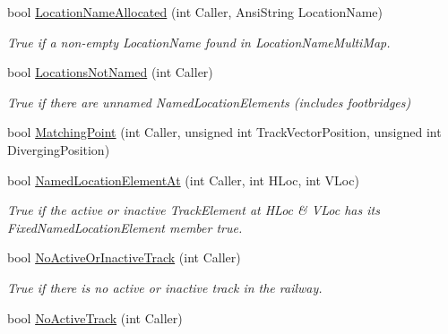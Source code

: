 \begin{DoxyCompactItemize}
\mbox{\label{class_t_track_adf9b0df7c51a36a4fca3a4ced7cc4a35}} 
bool \mbox{\hyperlink{class_t_track_adf9b0df7c51a36a4fca3a4ced7cc4a35}{Location\+Name\+Allocated}} (int Caller, Ansi\+String Location\+Name)
\begin{DoxyCompactList}\small\item\em True if a non-\/empty Location\+Name found in Location\+Name\+Multi\+Map. \end{DoxyCompactList}\item 
\mbox{\label{class_t_track_ad7d7ef450424ea6aab50db5445c6448c}} 
bool \mbox{\hyperlink{class_t_track_ad7d7ef450424ea6aab50db5445c6448c}{Locations\+Not\+Named}} (int Caller)
\begin{DoxyCompactList}\small\item\em True if there are unnamed Named\+Location\+Elements (includes footbridges) \end{DoxyCompactList}\item 
bool \mbox{\hyperlink{class_t_track_aa60a7460b2d95189e8de3817e4ad21f2}{Matching\+Point}} (int Caller, unsigned int Track\+Vector\+Position, unsigned int Diverging\+Position)
\item 
\mbox{\label{class_t_track_a198ba6486ccb7cdfb25bdd8c30451d06}} 
bool \mbox{\hyperlink{class_t_track_a198ba6486ccb7cdfb25bdd8c30451d06}{Named\+Location\+Element\+At}} (int Caller, int H\+Loc, int V\+Loc)
\begin{DoxyCompactList}\small\item\em True if the active or inactive Track\+Element at H\+Loc \& V\+Loc has its Fixed\+Named\+Location\+Element member true. \end{DoxyCompactList}\item 
\mbox{\label{class_t_track_ab20c55ecbc1801614695279daa8da0ba}} 
bool \mbox{\hyperlink{class_t_track_ab20c55ecbc1801614695279daa8da0ba}{No\+Active\+Or\+Inactive\+Track}} (int Caller)
\begin{DoxyCompactList}\small\item\em True if there is no active or inactive track in the railway. \end{DoxyCompactList}\item 
\mbox{\label{class_t_track_a2eaa84532799b76a0b42cf6e2611224d}} 
bool \mbox{\hyperlink{class_t_track_a2eaa84532799b76a0b42cf6e2611224d}{No\+Active\+Track}} (int Caller)

\end{DoxyCompactItemize}
